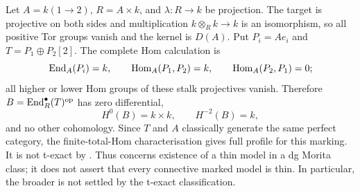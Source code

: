 \begin{example}\label{ex:marking-boundary}
Let \(A=k(1\to2)\), \(R=A\times k\), and \(\lambda:R\to k\) be projection.  The target is projective on both sides and multiplication \(k\otimes_Rk\to k\) is an isomorphism, so all positive Tor groups vanish and the kernel is \(D(A)\).  Put \(P_i=Ae_i\) and \(T=P_1\oplus P_2[2]\).  The complete Hom calculation is
\[
 \operatorname{End}_A(P_i)=k,\qquad
 \operatorname{Hom}_A(P_1,P_2)=k,\qquad\operatorname{Hom}_A(P_2,P_1)=0;
\]
all higher or lower Hom groups of these stalk projectives vanish.  Therefore \(B=\operatorname{End}_R^\bullet(T)^{\mathrm{op}}\) has zero differential,
\[
 H^0(B)=k\times k,\qquad H^{-2}(B)=k,
\]
and no other cohomology.  Since \(T\) and \(A\) classically generate the same perfect category, the finite-total-Hom characterisation gives full profile for this marking.  It is not t-exact by .  Thus  concerns existence of a thin model in a dg Morita class; it does not assert that every connective marked model is thin.  In particular, the broader  is not settled by the t-exact classification.
\end{example}
